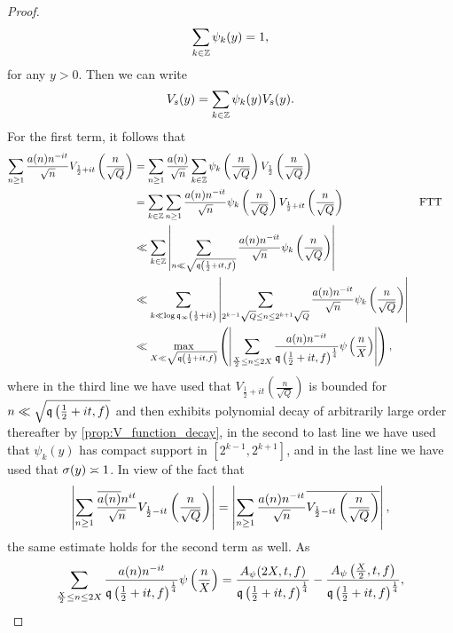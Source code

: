 \documentclass[12pt]{article}
\begin{document}
\begin{proof}
      \[
        \sum_{k \in \mathbb{Z}}\psi_{k}(y) = 1,
      \]
      for any \(y > 0\). Then we can write
      \[
        V_{s}(y) = \sum_{k \in \mathbb{Z}}\psi_{k}(y)V_{s}(y).
      \]
      For the first term, it follows that
      \begin{align*}
        \sum_{n \ge 1}\frac{a(n)n^{-it}}{\sqrt{n}}V_{\frac{1}{2}+it}\left(\frac{n}{\sqrt{Q}}\right) &= \sum_{n \ge 1}\frac{a(n)}{\sqrt{n}}\sum_{k \in \mathbb{Z}}\psi_{k}\left(\frac{n}{\sqrt{Q}}\right)V_{\frac{1}{2}}\left(\frac{n}{\sqrt{Q}}\right) \\
        &= \sum_{k \in \mathbb{Z}}\sum_{n \ge 1}\frac{a(n)n^{-it}}{\sqrt{n}}\psi_{k}\left(\frac{n}{\sqrt{Q}}\right)V_{\frac{1}{2}+it}\left(\frac{n}{\sqrt{Q}}\right) && \text{FTT} \\
        &\ll \sum_{k \in \mathbb{Z}}\left|\sum_{n \ll \sqrt{\mathfrak{q}\left(\frac{1}{2}+it,f\right)}}\frac{a(n)n^{-it}}{\sqrt{n}}\psi_{k}\left(\frac{n}{\sqrt{Q}}\right)\right| \\
        &\ll \sum_{k \ll \log{\mathfrak{q}_{\infty}\left(\frac{1}{2}+it\right)}}\left|\sum_{2^{k-1}\sqrt{Q} \le n \le 2^{k+1}\sqrt{Q}}\frac{a(n)n^{-it}}{\sqrt{n}}\psi_{k}\left(\frac{n}{\sqrt{Q}}\right)\right| \\
        &\ll \max_{X \ll \sqrt{\mathfrak{q}\left(\frac{1}{2}+it,f\right)}}\left(\left|\sum_{\frac{X}{2} \le n \le 2X}\frac{a(n)n^{-it}}{\mathfrak{q}\left(\frac{1}{2}+it,f\right)^{\frac{1}{4}}}\psi\left(\frac{n}{X}\right)\right|\right),
      \end{align*}
      where in the third line we have used that \(V_{\frac{1}{2}+it}\left(\frac{n}{\sqrt{Q}}\right)\) is bounded for \(n \ll \sqrt{\mathfrak{q}\left(\frac{1}{2}+it,f\right)}\) and then exhibits polynomial decay of arbitrarily large order thereafter by \cref{prop:V_function_decay}, in the second to last line we have used that \(\psi_{k}(y)\) has compact support in \([2^{k-1},2^{k+1}]\), and in the last line we have used that \(\sigma(y) \asymp 1\). In view of the fact that
      \[
        \left|\sum_{n \ge 1}\frac{\overline{a(n)}n^{it}}{\sqrt{n}}V_{\frac{1}{2}-it}\left(\frac{n}{\sqrt{Q}}\right)\right| = \left|\sum_{n \ge 1}\frac{a(n)n^{-it}}{\sqrt{n}}\overline{V_{\frac{1}{2}-it}\left(\frac{n}{\sqrt{Q}}\right)}\right|,
      \]
      the same estimate holds for the second term as well. As
      \[
        \sum_{\frac{X}{2} \le n \le 2X}\frac{a(n)n^{-it}}{\mathfrak{q}\left(\frac{1}{2}+it,f\right)^{\frac{1}{4}}}\psi\left(\frac{n}{X}\right) = \frac{A_{\psi}(2X,t,f)}{\mathfrak{q}\left(\frac{1}{2}+it,f\right)^{\frac{1}{4}}}-\frac{A_{\psi}\left(\frac{X}{2},t,f\right)}{\mathfrak{q}\left(\frac{1}{2}+it,f\right)^{\frac{1}{4}}},
\]
\end{proof}
\end{document}
